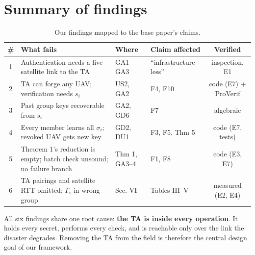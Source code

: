 \section{Summary of findings}
\begin{table}[H]
\centering\small
\caption{Our findings mapped to the base paper's claims.}
\label{tab:findings}
\begin{tabularx}{\linewidth}{@{}c>{\raggedright\arraybackslash}X l l c@{}}
\toprule
\# & What fails & Where & Claim affected & Verified\\
\midrule
1 & Authentication needs a live satellite link to the TA & GA1--GA3 & ``infrastructure-less'' & inspection, E1\\
2 & TA can forge any UAV; verification needs $s_i$ & US2, GA2 & F4, F10 & code (E7) + ProVerif\\
3 & Past group keys recoverable from $s_i$ & GA2, GD6 & F7 & algebraic\\
4 & Every member learns all $\sigma_i$; revoked UAV gets new key & GD2, DU1 & F3, F5, Thm 5 & code (E7, tests)\\
5 & Theorem 1's reduction is empty; batch check unsound; no failure branch & Thm 1, GA3--4 & F1, F8 & code (E3, E7)\\
6 & TA pairings and satellite RTT omitted; $\Gamma_i$ in wrong group & Sec. VI & Tables III--V & measured (E2, E4)\\
\bottomrule
\end{tabularx}
\end{table}

\begin{keybox}
All six findings share one root cause: \textbf{the TA is inside every operation}. It holds every secret, performs every check, and is reachable only over the
link the disaster degrades. Removing the TA from the field is therefore the central design goal of our framework.
\end{keybox}
